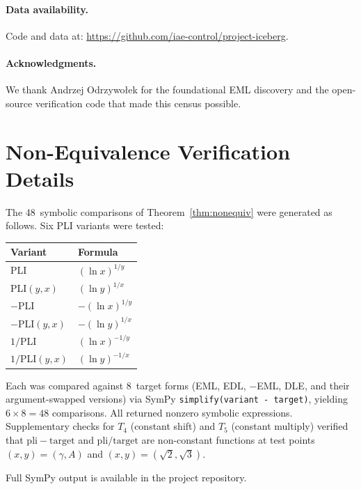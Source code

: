 \documentclass[10pt,twocolumn]{article}
\theoremstyle{remark}
\begin{document}
\paragraph{Data availability.} Code and data at: \url{https://github.com/iae-control/project-iceberg}.

\paragraph{Acknowledgments.} We thank Andrzej Odrzywołek for the foundational EML discovery and the open-source verification code that made this census possible.

\appendix
\section{Non-Equivalence Verification Details}

The 48~symbolic comparisons of Theorem~\ref{thm:nonequiv} were generated as follows. Six PLI variants were tested:

\begin{center}
\small
\begin{tabular}{ll}
\toprule
Variant & Formula\\
\midrule
PLI & $(\ln x)^{1/y}$\\
PLI$(y,x)$ & $(\ln y)^{1/x}$\\
$-$PLI & $-(\ln x)^{1/y}$\\
$-$PLI$(y,x)$ & $-(\ln y)^{1/x}$\\
$1/$PLI & $(\ln x)^{-1/y}$\\
$1/$PLI$(y,x)$ & $(\ln y)^{-1/x}$\\
\bottomrule
\end{tabular}
\end{center}

Each was compared against 8~target forms (EML, EDL, $-$EML, DLE, and their argument-swapped versions) via SymPy \texttt{simplify(variant - target)}, yielding $6 \times 8 = 48$ comparisons. All returned nonzero symbolic expressions. Supplementary checks for $T_4$ (constant shift) and $T_5$ (constant multiply) verified that $\mathrm{pli} - \mathrm{target}$ and $\mathrm{pli}/\mathrm{target}$ are non-constant functions at test points $(x,y) = (\gamma, A)$ and $(x,y) = (\sqrt{2}, \sqrt{3})$.

Full SymPy output is available in the project repository.
\end{document}
